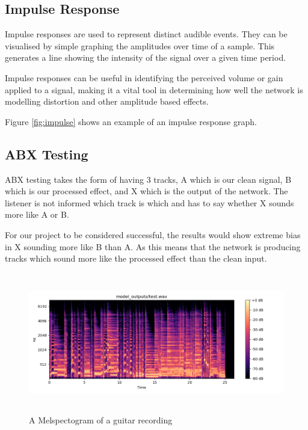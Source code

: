 \documentclass{l4proj}
\begin{document}
\hypertarget{impulse-response}{%
\subsection{Impulse Response}\label{impulse-response}}

Impulse responses are used to represent distinct audible events. They
can be visualised by simple graphing the amplitudes over time of a
sample. This generates a line showing the intensity of the signal over a
given time period.

Impulse responses can be useful in identifying the perceived volume or
gain applied to a signal, making it a vital tool in determining how well
the network is modelling distortion and other amplitude based effects.

Figure \ref{fig:impulse} shows an example of an impulse response graph.

\hypertarget{abx-testing}{%
\subsection{ABX Testing}\label{abx-testing}}

ABX testing takes the form of having 3 tracks, A which is our clean
signal, B which is our processed effect, and X which is the output of
the network. The listener is not informed which track is which and has
to say whether X sounds more like A or B.

For our project to be considered successful, the results would show
extreme bias in X sounding more like B than A. As this means that the
network is producing tracks which sound more like the processed effect
than the clean input.

\begin{figure}
\centering
\includegraphics[width=6in,height=2.4in]{images/spect.png}
\caption{A Melspectogram of a guitar recording\label{fig:spectogram}}
\end{figure}
\end{document}

